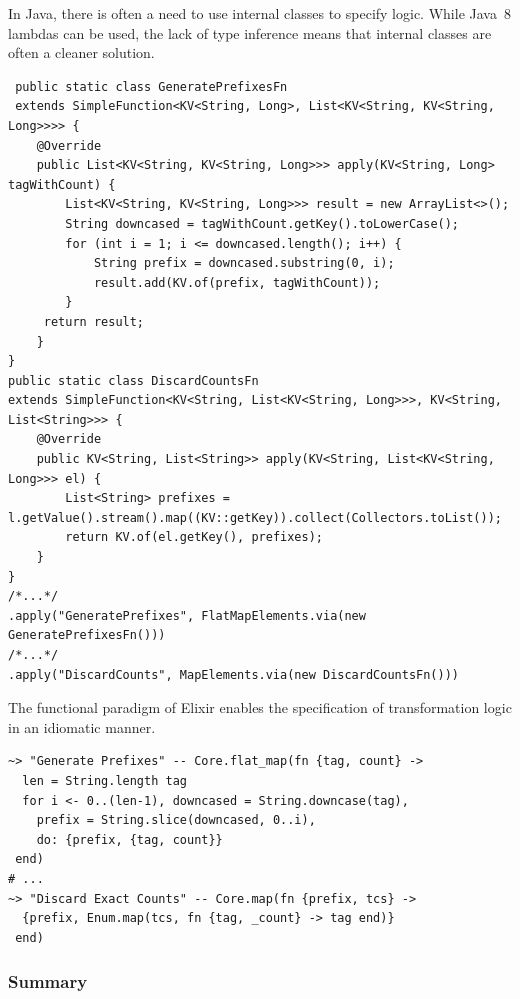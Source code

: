 \begin{codelisting}
	\caption[Using internal classes to specify transformation logic in Java.]{In Java, there is often a need to use internal classes to specify logic. While Java~8 lambdas can be used, the lack of type inference means that internal classes are often a cleaner solution.}
	\label{lst:eval:twitter-lambdas-java}
	\begin{verbatim}
 public static class GeneratePrefixesFn
 extends SimpleFunction<KV<String, Long>, List<KV<String, KV<String, Long>>>> {
    @Override
    public List<KV<String, KV<String, Long>>> apply(KV<String, Long> tagWithCount) {
        List<KV<String, KV<String, Long>>> result = new ArrayList<>();
        String downcased = tagWithCount.getKey().toLowerCase();
        for (int i = 1; i <= downcased.length(); i++) {
            String prefix = downcased.substring(0, i);
            result.add(KV.of(prefix, tagWithCount));
        }
     return result;
    }
}
public static class DiscardCountsFn
extends SimpleFunction<KV<String, List<KV<String, Long>>>, KV<String, List<String>>> {
    @Override
    public KV<String, List<String>> apply(KV<String, List<KV<String, Long>>> el) {
        List<String> prefixes = l.getValue().stream().map((KV::getKey)).collect(Collectors.toList());
        return KV.of(el.getKey(), prefixes);
    }
}
/*...*/
.apply("GeneratePrefixes", FlatMapElements.via(new GeneratePrefixesFn()))
/*...*/
.apply("DiscardCounts", MapElements.via(new DiscardCountsFn()))
	\end{verbatim}
\end{codelisting}

\begin{codelisting}
	\caption[Using lambdas to specify transformation logic in Elixir.]{The functional paradigm of Elixir enables the specification of transformation logic in an idiomatic manner.}
	\label{lst:eval:twitter-lambdas-elixir}
	\begin{verbatim}
~> "Generate Prefixes" -- Core.flat_map(fn {tag, count} ->
  len = String.length tag
  for i <- 0..(len-1), downcased = String.downcase(tag),
    prefix = String.slice(downcased, 0..i),
    do: {prefix, {tag, count}}
 end)
# ...
~> "Discard Exact Counts" -- Core.map(fn {prefix, tcs} ->
  {prefix, Enum.map(tcs, fn {tag, _count} -> tag end)}
 end)
	\end{verbatim}
\end{codelisting}

\subsubsection{Summary}

